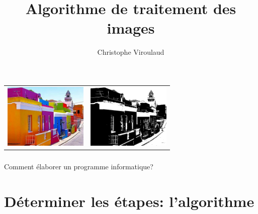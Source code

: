 \documentclass[svgnames,11pt]{beamer}
\author[]{Christophe Viroulaud}
\title{Algorithme de traitement des images}
\date{\framebox{\textbf{Phot 03}}}
\institute{Seconde - SNT}
\begin{document}
\begin{frame}
    \titlepage
\end{frame}
\begin{frame}
    \frametitle{}

    \begin{center}
        \begin{tabular}{cc}
            \includegraphics[width=4cm]{ressources/maisons-colorees.png}
             &
            \includegraphics[width=4cm]{ressources/maisons-colorees-NB.png}
            \\
        \end{tabular}
    \end{center}

\end{frame}
\begin{frame}
    \frametitle{}

    \begin{framed}
        \centering Comment élaborer un programme informatique?
    \end{framed}

\end{frame}
\section{Déterminer les étapes: l'algorithme}
\end{document}
